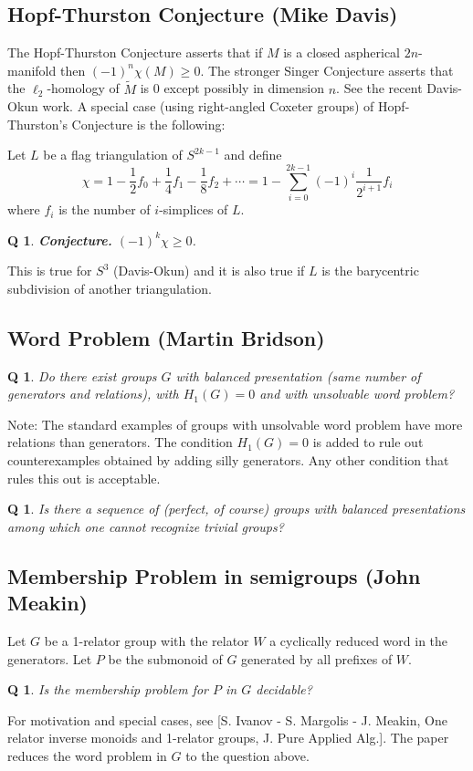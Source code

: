 \documentclass[11pt]{article}
\newtheorem{q}[thm]{Q}
\theoremstyle{remark}
\def\b{\begin{q}}
\def\e{\end{q}}
\newcommand{\<}{\langle}
\renewcommand{\>}{\rangle}
\begin{document}
\subsection{Hopf-Thurston Conjecture (Mike Davis)}

The Hopf-Thurston Conjecture asserts that if $M$ is a closed aspherical
$2n$-manifold then $(-1)^n\chi(M)\geq 0$. The stronger Singer Conjecture
asserts that the $\ell_2$-homology of $\tilde M$ is 0 except possibly in
dimension $n$. See the recent Davis-Okun work. A special case (using
right-angled Coxeter groups) of Hopf-Thurston's Conjecture is the following:

Let $L$ be a flag triangulation of $S^{2k-1}$ and define
$$\chi=1-\frac{1}{2}f_0+\frac{1}{4}f_1-\frac{1}{8}f_2+\cdots=1-\sum_{i=0}^{2k-1}(-1)^i\frac{1}{2^{i+1}}f_i$$
  where $f_i$ is the number of $i$-simplices of $L$.

\b
{\bf Conjecture.} $(-1)^k\chi\geq 0$.\e

This is true for $S^3$ (Davis-Okun) and it is also true if $L$ is the
barycentric subdivision of another triangulation. 




                                                            
\subsection{Word Problem (Martin Bridson)}
\b Do there exist groups $G$ with balanced presentation (same number of
   generators and relations), with $H_1(G)=0$ and with unsolvable word
   problem?\e

Note: The standard examples of groups with unsolvable word problem have more
relations than generators. The condition $H_1(G)=0$ is added to rule out
counterexamples obtained by adding silly generators. Any other condition that
rules this out is acceptable.

\b Is there a sequence of (perfect, of course) groups with balanced
presentations among which one cannot recognize trivial groups?  \e   


\subsection{Membership Problem in semigroups (John Meakin)}
Let $G$ be a 1-relator group with the relator $W$ a cyclically reduced word in
the generators. Let $P$ be the submonoid of $G$ generated by all prefixes of
$W$. 

\b Is the membership problem for $P$ in $G$ decidable?\e

For motivation and special cases, see [S. Ivanov - S. Margolis - J. Meakin,
One relator inverse monoids and 1-relator groups, J. Pure Applied Alg.]. The
paper reduces the word problem in $G$ to the question above.
\end{document}
